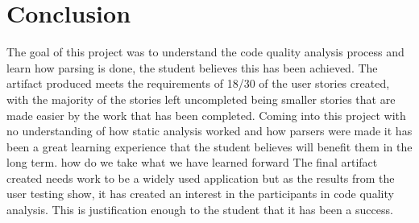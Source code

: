 \section{Conclusion}
The goal of this project was to understand the code quality analysis process and 
learn how parsing is done, the student believes this has been achieved. The artifact produced 
meets the requirements of 18/30 of the user stories created, with the majority of the stories left 
uncompleted being smaller stories that are made easier by the work that has been completed.
\newline
Coming into this project with no understanding of how static analysis worked and how parsers were 
made it has been a great learning experience that the student believes will benefit them 
in the long term.
how do we take what we have learned forward 
\newline
The final artifact created needs work to be a widely used application but as the results from the 
user testing show, it has created an interest in the participants in code quality analysis. This is justification 
enough to the student that it has been a success.